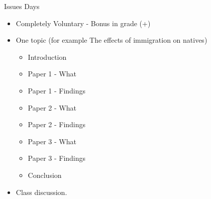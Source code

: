 \documentclass{beamer}
\newcommand{\1}{\mathbb{1}}
\begin{document}
\begin{frame}{Issues Days}
\begin{itemize}
\item Completely Voluntary - Bonus in grade (+)
\item One topic (for example The effects of immigration on natives)
\begin{itemize}
\item Introduction 
\item Paper 1 - What
\item Paper 1 - Findings 
\item Paper 2 - What 
\item Paper 2 - Findings
\item Paper 3 - What
\item Paper 3 - Findings
\item Conclusion
\end{itemize}
\item Class discussion.
\end{itemize}
\end{frame}
\end{document}
